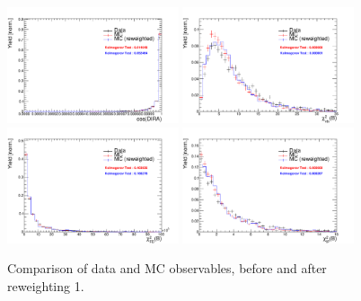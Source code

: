 \begin{figure}[h!]
\includegraphics[height=6.cm,width=0.45\textwidth]{figs/MC-v-Data/Bs_DIRA_OWNPV.pdf}
\includegraphics[height=6.cm,width=0.45\textwidth]{figs/MC-v-Data/Bs_ENDVERTEX_CHI2.pdf}\\
\includegraphics[height=6.cm,width=0.45\textwidth]{figs/MC-v-Data/Bs_FDCHI2_OWNPV.pdf}
\includegraphics[height=6.cm,width=0.45\textwidth]{figs/MC-v-Data/Bs_IPCHI2_OWNPV.pdf}
\caption{Comparison of data and MC observables, before and after reweighting 1.}
\end{figure}

